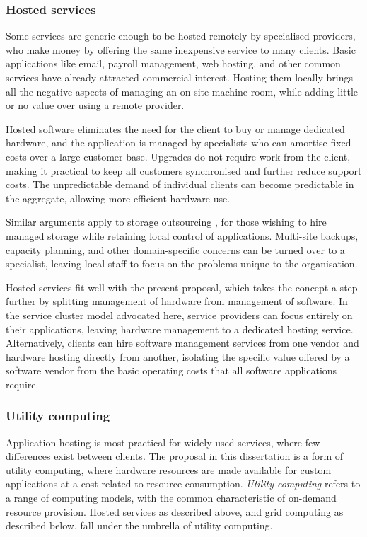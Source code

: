 \subsubsection{Hosted services}

Some services are generic enough to be hosted remotely by specialised providers, who make money by offering the same inexpensive service to many clients. Basic applications like email, payroll management, web hosting, and other common services have already attracted commercial interest. Hosting them locally brings all the negative aspects of managing an on-site machine room, while adding little or no value over using a remote provider.

Hosted software eliminates the need for the client to buy or manage dedicated hardware, and the application is managed by specialists who can amortise fixed costs over a large customer base. Upgrades do not require work from the client, making it practical to keep all customers synchronised and further reduce support costs. The unpredictable demand of individual clients can become predictable in the aggregate, allowing more efficient hardware use.

Similar arguments apply to storage outsourcing \cite{ng}, for those wishing to hire managed storage while retaining local control of applications. Multi-site backups, capacity planning, and other domain-specific concerns can be turned over to a specialist, leaving local staff to focus on the problems unique to the organisation.

Hosted services fit well with the present proposal, which takes the concept a step further by splitting management of hardware from management of software. In the service cluster model advocated here, service providers can focus entirely on their applications, leaving hardware management to a dedicated hosting service. Alternatively, clients can hire software management services from one vendor and hardware hosting directly from another, isolating the specific value offered by a software vendor from the basic operating costs that all software applications require.

\subsubsection{Utility computing}

Application hosting is most practical for widely-used services, where few differences exist between clients. The proposal in this dissertation is a form of utility computing, where hardware resources are made available for custom applications at a cost related to resource consumption. \emph{Utility computing} refers to a range of computing models, with the common characteristic of on-demand resource provision. Hosted services as described above, and grid computing as described below, fall under the umbrella of utility computing.

